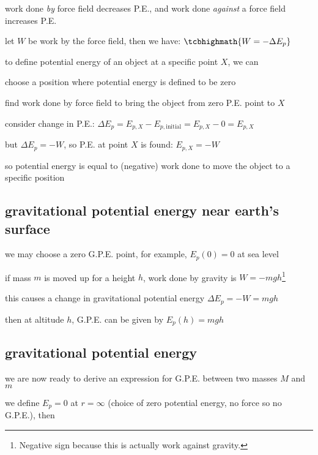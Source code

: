 work done \emph{by} force field decreases P.E., and work done \emph{against} a force field increases P.E.

let $W$ be work by the force field, then we have: $\tcbhighmath{W=-\Delta E_p}$

\newpage

to define potential energy of an object at a specific point $X$, we can

\begin{compactenum}
	\item[(1)] choose a position where potential energy is defined to be zero
	
	\item[(2)] find work done by force field to bring the object from zero P.E. point to $X$
	
	\item[(3)] consider change in P.E.: $\Delta E_p = E_{p,X} - E_{p,\text{initial}} = E_{p,X} - 0 = E_{p,X}$
	
	but $\Delta E_p = -W$, so P.E. at point $X$ is found: $E_{p,X} = -W$
	
\end{compactenum}

so potential energy is equal to (negative) work done to move the object to a specific position

\subsection*{gravitational potential energy near earth's surface}

we may choose a zero G.P.E. point, for example, $E_p(0) = 0$ at sea level

if mass $m$ is moved up for a height $h$, work done by gravity is $W=-mgh$\footnote{Negative sign because this is actually work against gravity.}

this causes a change in gravitational potential energy $\Delta E_p=-W=mg h$

then at altitude $h$, G.P.E. can be given by $E_p(h)=mgh$

\subsection{gravitational potential energy}


we are now ready to derive an expression for G.P.E. between two masses $M$ and $m$

we define $E_p=0$ at $r=\infty$ (choice of zero potential energy, no force so no G.P.E.), then

